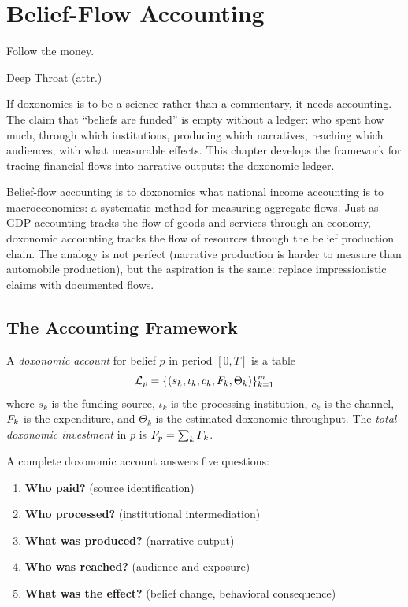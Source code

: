 \chapter{Belief-Flow Accounting}
\label{ch:belief-flow-accounting}

\epigraph{Follow the money.}{Deep Throat (attr.)}

\noindent
If doxonomics is to be a science rather than a commentary, it needs accounting.
The claim that ``beliefs are funded'' is empty without a ledger: who spent how much, through which institutions, producing which narratives, reaching which audiences, with what measurable effects.
This chapter develops the framework for tracing financial flows into narrative outputs: the doxonomic ledger.

Belief-flow accounting is to doxonomics what national income accounting is to macroeconomics: a systematic method for measuring aggregate flows.
Just as GDP accounting tracks the flow of goods and services through an economy, doxonomic accounting tracks the flow of resources through the belief production chain.
The analogy is not perfect (narrative production is harder to measure than automobile production), but the aspiration is the same: replace impressionistic claims with documented flows.


\section{The Accounting Framework}
\label{sec:ch14-framework}

\begin{definition}
\label{def:doxonomic-account}
A \emph{doxonomic account} for belief $p$ in period $[0, T]$ is a table
\[
  \mathcal{L}_p = \{(s_k, \iota_k, c_k, F_{k}, \Theta_k)\}_{k=1}^{m}
\]
where $s_k$ is the funding source, $\iota_k$ is the processing institution, $c_k$ is the channel, $F_{k}$ is the expenditure, and $\Theta_k$ is the estimated doxonomic throughput.
The \emph{total doxonomic investment} in $p$ is $F_p = \sum_k F_{k}$.
\end{definition}

A complete doxonomic account answers five questions:
\begin{enumerate}[nosep]
  \item \textbf{Who paid?} (source identification)
  \item \textbf{Who processed?} (institutional intermediation)
  \item \textbf{What was produced?} (narrative output)
  \item \textbf{Who was reached?} (audience and exposure)
  \item \textbf{What was the effect?} (belief change, behavioral consequence)
\end{enumerate}

